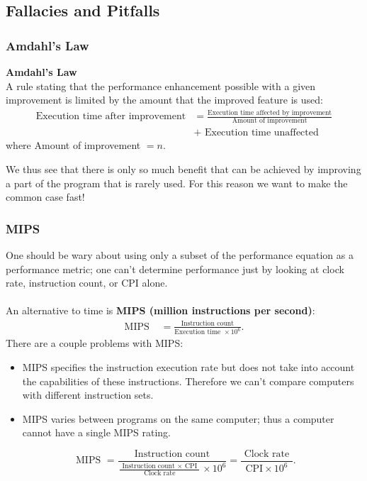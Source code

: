 \documentclass[10pt]{article}
\begin{document}
\subsection{Fallacies and Pitfalls}\label{subsec:}
\subsubsection{Amdahl's Law}
\begin{definition}
  \textbf{Amdahl's Law}\\
  A rule stating that the performance enhancement possible with a given improvement is limited by the amount that the improved feature is used:
\begin{align*}
  \text{Execution time after improvement}
  &= \frac{\text{Execution time affected by improvement}}{\text{Amount of improvement}}\\
    &+ \text{ Execution time unaffected} 
\end{align*}
where Amount of improvement $= n$.
\end{definition}
We thus see that there is only so much benefit that can be achieved by improving a part of the program that is rarely used.  For this reason we want to make the common case fast!
\subsubsection{MIPS}
One should be wary about using only a subset of the performance equation as a performance metric; one can't determine performance just by looking at clock rate, instruction count, or CPI alone.\\\\
An alternative to time is \textbf{MIPS (million instructions per second)}:
\begin{align*}
\text{MIPS }&= \frac{\text{Instruction count}}{\text{Execution time } \times 10^6}.
\end{align*}
There are a couple problems with MIPS:
\begin{itemize}
\item MIPS specifies the instruction execution rate but does not take into account the capabilities of these instructions. Therefore we can't compare computers with different instruction sets.
\item MIPS varies between programs on the same computer; thus a computer cannot have a single MIPS rating.
\end{itemize}
\[\text { MIPS }=\frac{\text { Instruction count }}{\frac{\text { Instruction count } \times \text { CPI }}{\text { Clock rate }} \times 10^6}=\frac{\text { Clock rate }}{\mathrm{CPI} \times 10^6}.\]
\end{document}
